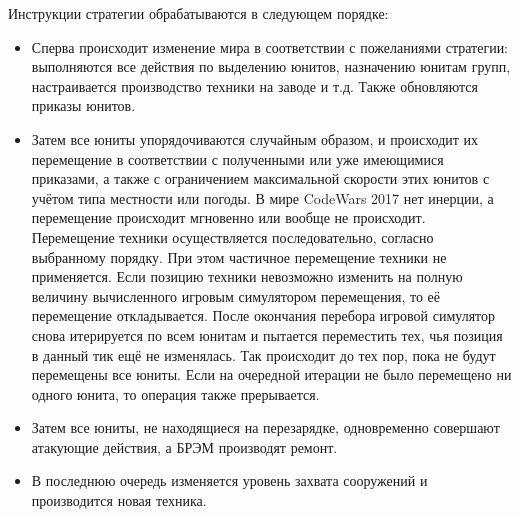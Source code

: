 Инструкции стратегии обрабатываются в следующем порядке:
\begin{itemize}
    \item Сперва происходит изменение мира в соответствии с пожеланиями стратегии: выполняются все действия по выделению юнитов, назначению
          юнитам групп, настраивается производство техники на заводе и т.д. Также обновляются приказы юнитов.
    \item Затем все юниты упорядочиваются случайным образом, и происходит их перемещение в соответствии с полученными или уже имеющимися
          приказами, а также с ограничением максимальной скорости этих юнитов с учётом типа местности или погоды. В мире CodeWars 2017 нет
          инерции, а перемещение происходит мгновенно или вообще не происходит. Перемещение техники осуществляется последовательно, согласно
          выбранному порядку. При этом частичное перемещение техники не применяется. Если позицию техники невозможно изменить на полную
          величину вычисленного игровым симулятором перемещения\footnotemark[3], то её перемещение откладывается. После окончания перебора
          игровой симулятор снова итерируется по всем юнитам и пытается переместить тех, чья позиция в данный тик ещё не изменялась. Так
          происходит до тех пор, пока не будут перемещены все юниты. Если на очередной итерации не было перемещено ни одного юнита, то
          операция также прерывается.
    \item Затем все юниты, не находящиеся на перезарядке, одновременно совершают атакующие действия, а БРЭМ производят ремонт.
    \item В последнюю очередь изменяется уровень захвата сооружений и производится новая техника.
\end{itemize}


